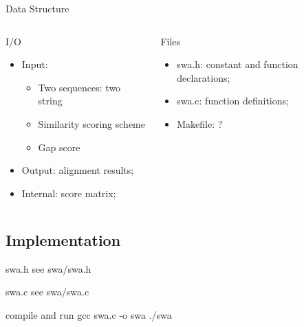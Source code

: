 \documentclass[UTF8]{beamer}
\begin{document}
\begin{frame}[t]{Data Structure}
\begin{columns}
  \begin{column}{.5\textwidth}
\begin{block}{I/O}
  \begin{itemize}
    \item Input:
    \begin{itemize}
        \item Two sequences: two string
        \item Similarity scoring scheme
        \item Gap score
    \end{itemize}
    \item Output: alignment results;
    \item Internal: score matrix;
  \end{itemize}
\end{block}
\end{column}

\begin{column}{.5\textwidth}
\begin{block}{Files}
  \begin{itemize}
    \item swa.h: constant and function declarations;
    \item swa.c: function definitions;
    \item Makefile: ?
  \end{itemize}
\end{block}
\end{column}
\end{columns}
\end{frame}

\subsection{Implementation}
\begin{frame}[t]{swa.h}
  see swa/swa.h
\end{frame}

\begin{frame}[t]{swa.c}
  see swa/swa.c
\end{frame}

\begin{frame}[t]{compile and run}
  gcc swa.c -o swa
  ./swa
\end{frame}
\end{document}
